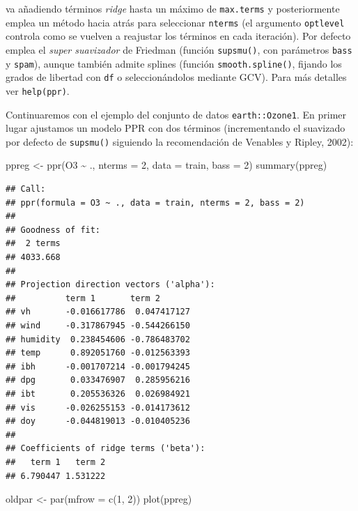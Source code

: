 \documentclass[
]{book}
\newenvironment{Shaded}{\begin{snugshade}}{\end{snugshade}}
\newcommand{\AttributeTok}[1]{\textcolor[rgb]{0.77,0.63,0.00}{#1}}
\newcommand{\DecValTok}[1]{\textcolor[rgb]{0.00,0.00,0.81}{#1}}
\newcommand{\FunctionTok}[1]{\textcolor[rgb]{0.00,0.00,0.00}{#1}}
\newcommand{\NormalTok}[1]{#1}
\newcommand{\OtherTok}[1]{\textcolor[rgb]{0.56,0.35,0.01}{#1}}
\newcommand{\SpecialCharTok}[1]{\textcolor[rgb]{0.00,0.00,0.00}{#1}}
\theoremstyle{break}
\theoremstyle{definition}
\theoremstyle{definition}
\theoremstyle{definition}
\theoremstyle{definition}
\theoremstyle{remark}
\begin{document}
va añadiendo términos \emph{ridge} hasta un máximo de \texttt{max.terms} y posteriormente emplea un método hacia atrás para seleccionar \texttt{nterms} (el argumento \texttt{optlevel} controla como se vuelven a reajustar los términos en cada iteración).
Por defecto emplea el \emph{super suavizador} de Friedman (función \texttt{supsmu()}, con parámetros \texttt{bass} y \texttt{spam}), aunque también admite splines (función \texttt{smooth.spline()}, fijando los grados de libertad con \texttt{df} o seleccionándolos mediante GCV).
Para más detalles ver \texttt{help(ppr)}.

Continuaremos con el ejemplo del conjunto de datos \texttt{earth::Ozone1}. En primer lugar ajustamos un modelo PPR con dos términos (incrementando el suavizado por defecto de \texttt{supsmu()} siguiendo la recomendación de Venables y Ripley, 2002):

\begin{Shaded}
\begin{Highlighting}[]
\NormalTok{ppreg }\OtherTok{\textless{}{-}} \FunctionTok{ppr}\NormalTok{(O3 }\SpecialCharTok{\textasciitilde{}}\NormalTok{ ., }\AttributeTok{nterms =} \DecValTok{2}\NormalTok{, }\AttributeTok{data =}\NormalTok{ train, }\AttributeTok{bass =} \DecValTok{2}\NormalTok{)}
\FunctionTok{summary}\NormalTok{(ppreg)}
\end{Highlighting}
\end{Shaded}

\begin{verbatim}
## Call:
## ppr(formula = O3 ~ ., data = train, nterms = 2, bass = 2)
## 
## Goodness of fit:
##  2 terms 
## 4033.668 
## 
## Projection direction vectors ('alpha'):
##          term 1       term 2      
## vh       -0.016617786  0.047417127
## wind     -0.317867945 -0.544266150
## humidity  0.238454606 -0.786483702
## temp      0.892051760 -0.012563393
## ibh      -0.001707214 -0.001794245
## dpg       0.033476907  0.285956216
## ibt       0.205536326  0.026984921
## vis      -0.026255153 -0.014173612
## doy      -0.044819013 -0.010405236
## 
## Coefficients of ridge terms ('beta'):
##   term 1   term 2 
## 6.790447 1.531222
\end{verbatim}

\begin{Shaded}
\begin{Highlighting}[]
\NormalTok{oldpar }\OtherTok{\textless{}{-}} \FunctionTok{par}\NormalTok{(}\AttributeTok{mfrow =} \FunctionTok{c}\NormalTok{(}\DecValTok{1}\NormalTok{, }\DecValTok{2}\NormalTok{))}
\FunctionTok{plot}\NormalTok{(ppreg)}
\end{Highlighting}
\end{Shaded}
\end{document}
